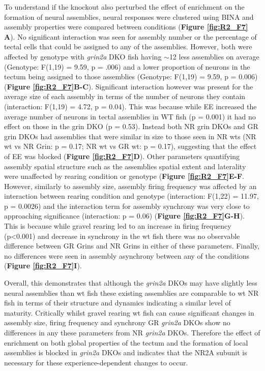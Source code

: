 To understand if the knockout also perturbed the effect of enrichment on the formation of neural assemblies, neural responses were clustered using BINA and assembly properties were compared between conditions (\textbf{Figure \ref{fig:R2_F7} A}). No significant interaction was seen for assembly number or the percentage of tectal cells that could be assigned to any of the assemblies. However, both were affected by genotype with \textit{grin2a} DKO fish having  $\sim$12 less assemblies on average (Genotype: F(1,19) = 9.59, p = .006) and a lower proportion of neurons in the tectum being assigned to those assemblies (Genotype: F(1,19) =  9.59, p = 0.006) (\textbf{Figure \ref{fig:R2_F7}B-C}). Significant interaction however was present for the average size of each assembly in terms of the number of neurons they contain (interaction: F(1,19) = 4.72, p = 0.04). This was because while EE increased the average number of neurons in tectal assemblies in WT fish (p = 0.001) it had no effect on those in the \gls{grin} DKO (p = 0.53). Instead both NR \gls{grin} DKOs and GR \gls{grin} DKOs had assemblies that were similar in size to those seen in NR \gls{wt}s (NR \gls{wt} vs NR Grin: p = 0.17; NR \gls{wt} vs GR \gls{wt}: p = 0.17), suggesting that the effect of EE was blocked (\textbf{Figure \ref{fig:R2_F7}D}).
 Other parameters quantifying assembly spatial structure such as the assemblies spatial extent and laterality were unaffected by rearing condition or genotype (\textbf{Figure \ref{fig:R2_F7}E-F}. However, similarly to assembly size, assembly firing frequency was affected by an interaction between rearing condition and genotype (interaction: F(1,22) = 11.97, p = 0.0026) and the interaction term for assembly synchrony was very close to approaching significance (interaction: p = 0.06) (\textbf{Figure \ref{fig:R2_F7}G-H}). This is because while gravel rearing led to an increase in firing frequency (p<0.001) and decrease in synchrony in the \gls{wt} fish there was no observable difference between GR Grins and NR Grins in either of these parameters. Finally, no differences were seen in assembly asynchrony between any of the conditions (\textbf{Figure \ref{fig:R2_F7}I}). 

Overall, this demonstrates that although the \textit{grin2a} DKOs may have slightly less neural assemblies than \gls{wt} fish these existing assemblies are comparable to \gls{wt} NR fish in terms of their structure and dynamics indicating a similar level of maturity.  Critically whilst gravel rearing \gls{wt} fish can cause significant changes in assembly size, firing frequency and synchrony GR \textit{grin2a} DKOs show no differences in any these parameters from NR \textit{grin2a} DKOs. Therefore the effect of enrichment on both global properties of the tectum and the formation of local assemblies is blocked in  \textit{grin2a} DKOs and indicates that the NR2A subunit is necessary for these experience-dependent changes to occur.


